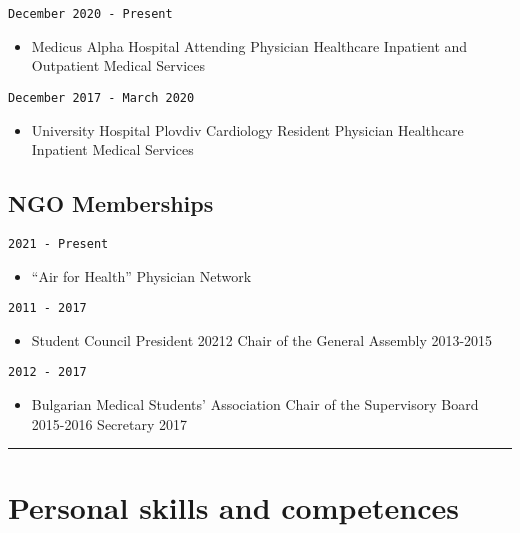 \documentclass[
  12pt,
  letterpaper,
  DIV=11,
  numbers=noendperiod]{scrartcl}
\providecommand{\tightlist}{%
  \setlength{\itemsep}{0pt}\setlength{\parskip}{0pt}}\usepackage{longtable,booktabs,array}
\begin{document}
\texttt{December\ 2020\ -\ Present}

\begin{itemize}
\tightlist
\item
  Medicus Alpha Hospital \textbar{} Attending Physician \textbar{}
  Healthcare \textbar{} Inpatient and Outpatient Medical Services
\end{itemize}

\texttt{December\ 2017\ -\ March\ 2020}

\begin{itemize}
\tightlist
\item
  University Hospital Plovdiv \textbar{} Cardiology Resident Physician
  \textbar{} Healthcare \textbar{} Inpatient Medical Services
\end{itemize}

\subsection{NGO Memberships}\label{ngo-memberships}

\texttt{2021\ -\ Present}

\begin{itemize}
\tightlist
\item
  ``Air for Health'' Physician Network
\end{itemize}

\texttt{2011\ -\ 2017}

\begin{itemize}
\tightlist
\item
  Student Council \textbar{} President 20212 \textbar{} Chair of the
  General Assembly 2013-2015
\end{itemize}

\texttt{2012\ -\ 2017}

\begin{itemize}
\tightlist
\item
  Bulgarian Medical Students' Association \textbar{} Chair of the
  Supervisory Board 2015-2016 \textbar{} Secretary 2017
\end{itemize}

\begin{center}\rule{0.5\linewidth}{0.5pt}\end{center}

\section{Personal skills and
competences}\label{personal-skills-and-competences}
\end{document}
